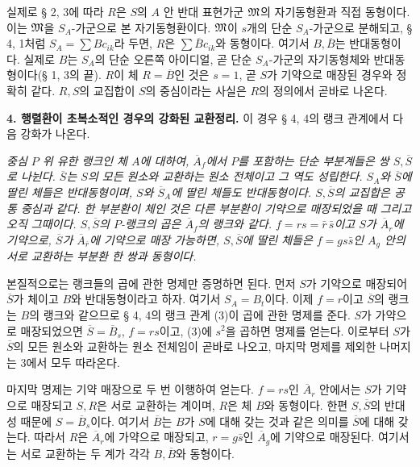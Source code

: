 실제로 § 2, 3에 따라 \(R\)은 \(S\)의 \(A\) 안 반대 표현가군 \(\mathfrak M\)의 자기동형환과 직접 동형이다. 이는 \(\mathfrak M\)을 \(S_A\)-가군으로 본 자기동형환이다. \(\mathfrak M\)이 \(s\)개의 단순 \(S_A\)-가군으로 분해되고, § 4, 1처럼 \(S_A=\sum Bc_{ik}\)라 두면, \(R\)은 \(\sum\overline Bc_{ik}\)와 동형이다. 여기서 \(B,\overline B\)는 반대동형이다. 실제로 \(B\)는 \(S_A\)의 단순 오른쪽 아이디얼, 곧 단순 \(S_A\)-가군의 자기동형체와 반대동형이다(§ 1, 3의 끝). \(R\)이 체 \(R=\overline B\)인 것은 \(s=1\), 곧 \(S\)가 기약으로 매장된 경우와 정확히 같다. \(R,S\)의 교집합이 \(S\)의 중심이라는 사실은 \(R\)의 정의에서 곧바로 나온다.

\noindent\textbf{4. 행렬환이 초복소적인 경우의 강화된 교환정리.} 이 경우 § 4, 4의 랭크 관계에서 다음 강화가 나온다.

\emph{중심 \(P\) 위 유한 랭크인 체 \(A\)에 대하여, \(\overline A_f\)에서 \(P\)를 포함하는 단순 부분계들은 쌍 \(S,\overline S\)로 나뉜다. \(\overline S\)는 \(S\)의 모든 원소와 교환하는 원소 전체이고 그 역도 성립한다. \(S_A\)와 \(\overline S\)에 딸린 체들은 반대동형이며, \(S\)와 \(\overline S_A\)에 딸린 체들도 반대동형이다. \(S,\overline S\)의 교집합은 공통 중심과 같다. 한 부분환이 체인 것은 다른 부분환이 기약으로 매장되었을 때 그리고 오직 그때이다. \(S,\overline S\)의 \(P\)-랭크의 곱은 \(\overline A_f\)의 랭크와 같다. \(f=rs=\bar r\,\bar s\)이고 \(S\)가 \(\overline A_r\)에 기약으로, \(\overline S\)가 \(\overline A_{\bar r}\)에 기약으로 매장 가능하면, \(S,\overline S\)에 딸린 체들은 \(f=g s\bar s\)인 \(A_g\) 안의 서로 교환하는 부분환 한 쌍과 동형이다.}

본질적으로는 랭크들의 곱에 관한 명제만 증명하면 된다. 먼저 \(S\)가 기약으로 매장되어 \(\overline S\)가 체이고 \(B\)와 반대동형이라고 하자. 여기서 \(S_A=B_t\)이다. 이제 \(f=r\)이고 \(\overline S\)의 랭크는 \(B\)의 랭크와 같으므로 § 4, 4의 랭크 관계 (3)이 곱에 관한 명제를 준다. \(S\)가 가약으로 매장되었으면 \(\overline S=\overline B_s\), \(f=rs\)이고, (3)에 \(s^2\)을 곱하면 명제를 얻는다. 이로부터 \(S\)가 \(\overline S\)의 모든 원소와 교환하는 원소 전체임이 곧바로 나오고, 마지막 명제를 제외한 나머지는 3에서 모두 따라온다.

마지막 명제는 기약 매장으로 두 번 이행하여 얻는다. \(f=rs\)인 \(\overline A_r\) 안에서는 \(S\)가 기약으로 매장되고 \(S,R\)은 서로 교환하는 계이며, \(R\)은 체 \(B\)와 동형이다. 한편 \(S,\overline S\)의 반대성 때문에 \(S=\overline B_s\)이다. 여기서 \(\overline B\)는 \(B\)가 \(S\)에 대해 갖는 것과 같은 의미를 \(\overline S\)에 대해 갖는다. 따라서 \(R\)은 \(\overline A_r\)에 가약으로 매장되고, \(r=g\bar s\)인 \(\overline A_g\)에 기약으로 매장된다. 여기서는 서로 교환하는 두 계가 각각 \(B,\overline B\)와 동형이다.

